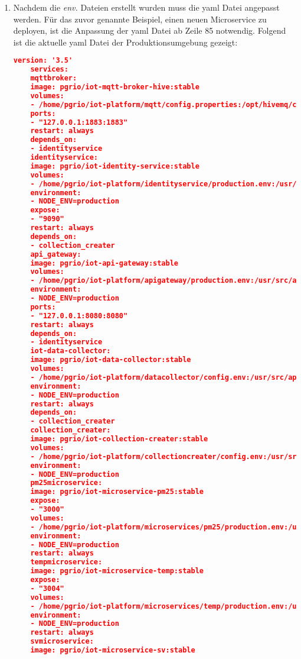 \begin{enumerate}
\begin{itemize}
		\item RENEW\_INTERVAL Das Zeitintervall, in dem der Microservice ein neues Token anfragt
		\item SERVICE\_HOST: Entspricht dem Namen des Microservices in der yaml Datei und ist notwendig, damit das API Gateway die Anfragen, an der richtigen Microservice weiterleiten kann
		\end{itemize}
	\item Nachdem die \textit{env.} Dateien erstellt wurden muss die yaml Datei angepasst werden. Für das zuvor genannte Beispiel, einen neuen Microservice zu deployen, ist die Anpassung der yaml Datei ab Zeile 85 notwendig. Folgend ist die aktuelle yaml Datei der Produktionsumgebung gezeigt: \newline
	\begin{lstlisting}[language=json,basicstyle=\footnotesize]
	version: '3.5'
	services:
	mqttbroker:
	image: pgrio/iot-mqtt-broker-hive:stable
	volumes:
	- /home/pgrio/iot-platform/mqtt/config.properties:/opt/hivemq/config.properties
	ports:
	- "127.0.0.1:1883:1883"
	restart: always
	depends_on:
	- identityservice
	identityservice:
	image: pgrio/iot-identity-service:stable
	volumes:
	- /home/pgrio/iot-platform/identityservice/production.env:/usr/src/app/production.env
	environment:
	- NODE_ENV=production
	expose:
	- "9090"
	restart: always
	depends_on:
	- collection_creater
	api_gateway:
	image: pgrio/iot-api-gateway:stable
	volumes:
	- /home/pgrio/iot-platform/apigateway/production.env:/usr/src/app/production.env
	environment:
	- NODE_ENV=production
	ports:
	- "127.0.0.1:8080:8080"
	restart: always
	depends_on:
	- identityservice
	iot-data-collector:
	image: pgrio/iot-data-collector:stable
	volumes:
	- /home/pgrio/iot-platform/datacollector/config.env:/usr/src/app/config.env
	environment:
	- NODE_ENV=production
	restart: always
	depends_on:
	- collection_creater
	collection_creater:
	image: pgrio/iot-collection-creater:stable
	volumes:
	- /home/pgrio/iot-platform/collectioncreater/config.env:/usr/src/app/config.env
	environment:
	- NODE_ENV=production
	pm25microservice:
	image: pgrio/iot-microservice-pm25:stable
	expose:
	- "3000"
	volumes:
	- /home/pgrio/iot-platform/microservices/pm25/production.env:/usr/src/app/production.env
	environment:
	- NODE_ENV=production
	restart: always
	tempmicroservice:
	image: pgrio/iot-microservice-temp:stable
	expose:
	- "3004"
	volumes:
	- /home/pgrio/iot-platform/microservices/temp/production.env:/usr/src/app/production.env
	environment:
	- NODE_ENV=production
	restart: always
	svmicroservice:
	image: pgrio/iot-microservice-sv:stable

\end{lstlisting}
\end{enumerate}
